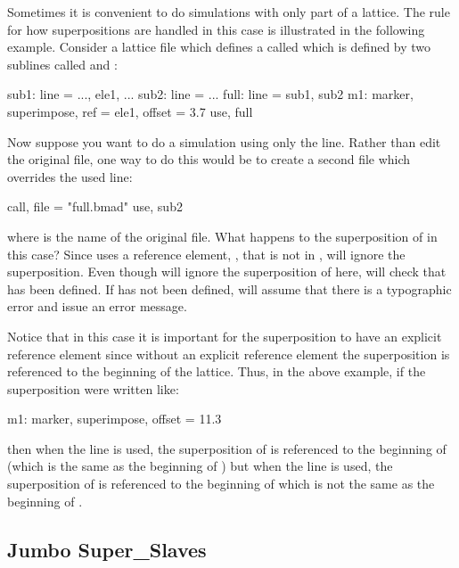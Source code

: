 Sometimes it is convenient to do simulations with only part of a lattice. The rule for how
superpositions are handled in this case is illustrated in the following example. Consider
a lattice file which defines a  called  which is defined by two sublines called
 and :
\begin{example}
  sub1: line = {..., ele1, ...}
  sub2: line = {...}
  full: line = {sub1, sub2}
  m1: marker, superimpose, ref = ele1, offset = 3.7
  use, full
\end{example}
Now suppose you want to do a simulation using only the  line. Rather than edit the
original file, one way to do this would be to create a second file which
overrides the used line:
\begin{example}
  call, file = "full.bmad"
  use, sub2
\end{example}
where  is the name of the original file. What happens to the superposition
of  in this case? Since  uses a reference element, , that is not in
, \bmad will ignore the superposition. Even though \bmad will ignore the superposition
of  here, \bmad will check that  has been defined. If  has not been
defined, \bmad will assume that there is a typographic error and issue an error message. 

Notice that in this case it is important for the superposition to have an explicit
reference element since without an explicit reference element the superposition is
referenced to the beginning of the lattice. Thus, in the above example, if the
superposition were written like:
\begin{example}
  m1: marker, superimpose, offset = 11.3
\end{example}
then when the  line is used, the superposition of  is referenced to the
beginning of  (which is the same as the beginning of ) but when the
 line is used, the superposition of  is referenced to the beginning
of  which is not the same as the beginning of .

\subsection{Jumbo Super_Slaves}
\label{s:jumbo.slave}

